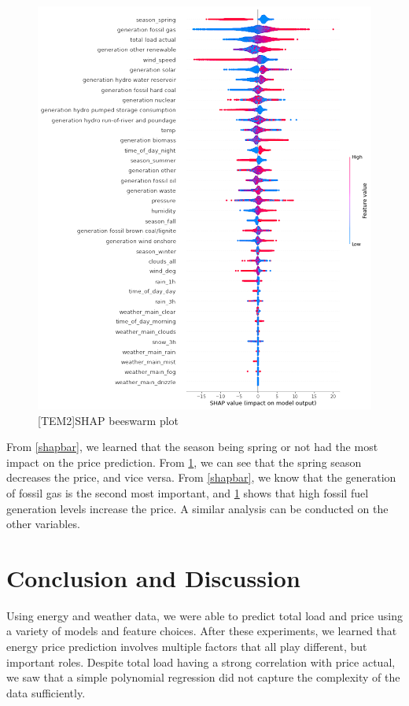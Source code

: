 \documentclass[10pt]{article}
\begin{document}
\begin{figure}[H]
\begin{minipage}[t]{0.45\textwidth}
    \includegraphics[width=1.4\linewidth]{shapbee.png}
    [TEM2]{SHAP beeswarm plot}
    \label{shapbee}
    \end{minipage}
\end{figure}



From \ref{shapbar}, we learned that the season being spring or not had the most impact on the price prediction. From \ref{shapbee}, we can see that the spring season decreases the price, and vice versa. From \ref{shapbar}, we know that the generation of fossil gas is the second most important, and \ref{shapbee} shows that high fossil fuel generation levels increase the price.  A similar analysis can be conducted on the other variables.

\section{Conclusion and Discussion}\label{sec:6}
Using energy and weather data, we were able to predict total load and price using a variety of models and feature choices. After these experiments, we learned that energy price prediction involves multiple factors that all play different, but important roles. Despite total load having a strong correlation with price actual, we saw that a simple polynomial regression did not capture the complexity of the data sufficiently.
\end{document}
